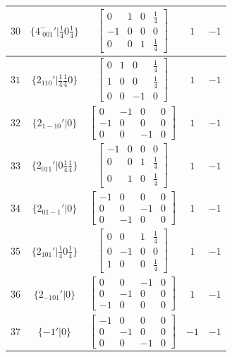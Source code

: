 \documentclass[fleqn,8pt]{jsarticle}
\begin{document}
\begin{longtable}{ccccc}
$ 30 $ & $ \{4^{-}_{\,\,001}{}'|\frac{1}{4} 0 \frac{1}{4}\} $ & $ \begin{bmatrix} 0 & 1 & 0 & \frac{1}{4} \\ -1 & 0 & 0 & 0 \\ 0 & 0 & 1 & \frac{1}{4} \end{bmatrix} $ & $ 1 $ & $ -1 $ \\ \hline
$ 31 $ & $ \{2{}_{110}{}'|\frac{1}{4} \frac{1}{4} 0\} $ & $ \begin{bmatrix} 0 & 1 & 0 & \frac{1}{4} \\ 1 & 0 & 0 & \frac{1}{4} \\ 0 & 0 & -1 & 0 \end{bmatrix} $ & $ 1 $ & $ -1 $ \\ \hline
$ 32 $ & $ \{2{}_{1-10}{}'|0\} $ & $ \begin{bmatrix} 0 & -1 & 0 & 0 \\ -1 & 0 & 0 & 0 \\ 0 & 0 & -1 & 0 \end{bmatrix} $ & $ 1 $ & $ -1 $ \\ \hline
$ 33 $ & $ \{2{}_{011}{}'|0 \frac{1}{4} \frac{1}{4}\} $ & $ \begin{bmatrix} -1 & 0 & 0 & 0 \\ 0 & 0 & 1 & \frac{1}{4} \\ 0 & 1 & 0 & \frac{1}{4} \end{bmatrix} $ & $ 1 $ & $ -1 $ \\ \hline
$ 34 $ & $ \{2{}_{01-1}{}'|0\} $ & $ \begin{bmatrix} -1 & 0 & 0 & 0 \\ 0 & 0 & -1 & 0 \\ 0 & -1 & 0 & 0 \end{bmatrix} $ & $ 1 $ & $ -1 $ \\ \hline
$ 35 $ & $ \{2{}_{101}{}'|\frac{1}{4} 0 \frac{1}{4}\} $ & $ \begin{bmatrix} 0 & 0 & 1 & \frac{1}{4} \\ 0 & -1 & 0 & 0 \\ 1 & 0 & 0 & \frac{1}{4} \end{bmatrix} $ & $ 1 $ & $ -1 $ \\ \hline
$ 36 $ & $ \{2{}_{-101}{}'|0\} $ & $ \begin{bmatrix} 0 & 0 & -1 & 0 \\ 0 & -1 & 0 & 0 \\ -1 & 0 & 0 & 0 \end{bmatrix} $ & $ 1 $ & $ -1 $ \\ \hline
$ 37 $ & $ \{-1{}'|0\} $ & $ \begin{bmatrix} -1 & 0 & 0 & 0 \\ 0 & -1 & 0 & 0 \\ 0 & 0 & -1 & 0 \end{bmatrix} $ & $ -1 $ & $ -1 $ \\ \hline

\end{longtable}
\end{document}
